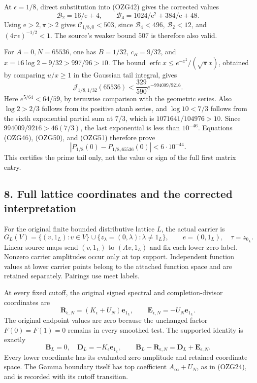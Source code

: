 \documentclass[
  10pt,
  a4paper,
]{article}
\begin{document}
At \(\epsilon=1/8\), direct substitution into (OZG42) gives the
corrected values \[
\mathcal B_2=16/\mathrm e+4,\qquad
\mathcal B_4=1024/\mathrm e^2+384/\mathrm e+48.
\tag{OZG50}
\] Using \(\mathrm e>2,\pi>2\) gives \(\mathcal C_{1/8,0}<503\), since
\(\mathcal B_4<496\), \(\mathcal B_2<12\), and
\((4\pi\epsilon)^{-1/2}<1\). The source's weaker bound \(507\) is
therefore also valid.

For \(A=0,N=65536\), one has \(B=1/32\), \(c_B=9/32\), and
\(x=16\log2-9/32>997/96>10\). The bound
\(\operatorname{erfc}x\le e^{-x^2}/(\sqrt\pi x)\), obtained by comparing
\(u/x\ge1\) in the Gaussian tail integral, gives \[
\mathcal J_{1/8,1/32}(65536)
<\frac{329}{590}e^{-994009/9216}.
\tag{OZG51}
\] Here \(e^{5/64}<64/59\), by termwise comparison with the geometric
series. Also \(\log2>2/3\) follows from its positive atanh series, and
\(\log10<7/3\) follows from the sixth exponential partial sum at
\(7/3\), which is \(1071641/104976>10\). Since \(994009/9216>46(7/3)\),
the last exponential is less than \(10^{-46}\). Equations (OZG46),
(OZG50), and (OZG51) therefore prove \[
|P_{1/8}(0)-P_{1/8,65536}(0)|<6\cdot10^{-44}.
\tag{OZG52}
\] This certifies the prime tail only, not the value or sign of the full
first matrix entry.

\subsection{8. Full lattice coordinates and the corrected
interpretation}\label{full-lattice-coordinates-and-the-corrected-interpretation}

For the original finite bounded distributive lattice \(L\), the actual
carrier is \[
G_L(V)=\{(v,1_L):v\in V\}
\cup\{z_\lambda=(0,\lambda):\lambda\ne1_L\},\qquad
e=(0,1_L),\quad\tau=z_{0_L}.
\tag{OZG53}
\] Linear source maps send \((v,1_L)\) to \((Av,1_L)\) and fix each
lower zero label. Nonzero carrier amplitudes occur only at top support.
Independent function values at lower carrier points belong to the
attached function space and are retained separately. Pairings use meet
labels.

At every fixed cutoff, the original signed spectral and
completion-divisor coordinates are \[
\boldsymbol R_{\epsilon,N}
=(K_\epsilon+U_N)\mathbf e_{1_L},\qquad
\boldsymbol E_{\epsilon,N}=-U_N\mathbf e_{1_L}.
\tag{OZG54}
\] The original endpoint values are zero because the unchanged factor
\(F(0)=F(1)=0\) remains in every smoothed test. The supported identity
is exactly \[
\boldsymbol B_L=0,\quad
\boldsymbol D_L=-K_\epsilon\mathbf e_{1_L},\qquad
\boldsymbol B_L-\boldsymbol R_{\epsilon,N}
=\boldsymbol D_L+\boldsymbol E_{\epsilon,N}.
\tag{OZG55}
\] Every lower coordinate has its evaluated zero amplitude and retained
coordinate space. The Gamma boundary itself has top coefficient
\(A_\infty+U_N\), as in (OZG24), and is recorded with its cutoff
transition.
\end{document}
